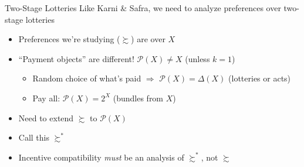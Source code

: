 \begin{frame}{Two-Stage Lotteries}
Like Karni \& Safra, we need to analyze preferences over two-stage lotteries
\begin{itemize}
    \item Preferences we're studying ($\succsim$) are over $X$
    \item ``Payment objects'' are different! $\mathcal{P}(X)\neq X$ (unless $k=1$)
    \begin{itemize}
        \item Random choice of what's paid $\Rightarrow$ $\mathcal{P}(X)=\Delta(X)$ (lotteries or acts)
        \item Pay all: $\mathcal{P}(X)=2^X$ (bundles from $X$)
    \end{itemize}
    \item Need to extend $\succsim$ to $\mathcal{P}(X)$
    \item Call this $\succsim^*$
    \item Incentive compatibility \textit{must} be an analysis of $\succsim^*$, not $\succsim$
\end{itemize}
    
\end{frame}


